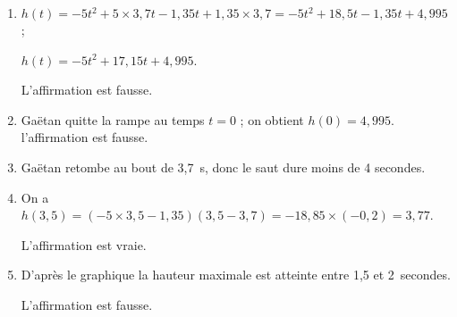 
\medskip

%
%
%
%
%
%
%
%
%

\begin{enumerate}
\item %
$h(t) = - 5t^2 + 5 \times 3,7t - 1,35t + 1,35 \times 3,7 = - 5t^2 + 18,5t - 1,35t + 4,995$ ;

$h(t) = - 5t^2 + 17,15t + 4,995$.

L'affirmation est fausse.
\item %
Gaëtan quitte la rampe au temps $t = 0$ ; on obtient $h(0) = 4,995$. l'affirmation est fausse.
\item %
Gaëtan retombe au bout de 3,7~s, donc le saut dure moins de 4 secondes.
\item %
On a $h(3,5) = (- 5 \times 3,5 - 1,35)(3,5 - 3,7)  = - 18,85 \times ( - 0,2) = 3,77$.

L'affirmation est vraie.
\item %
D'après le graphique la hauteur maximale est atteinte entre 1,5 et 2~secondes.

L'affirmation est fausse.
\end{enumerate}

\vspace{0,5cm}

